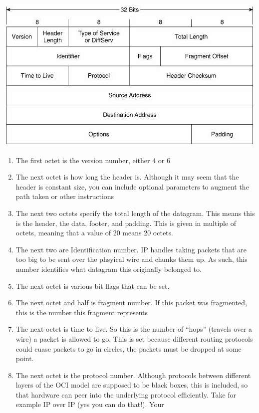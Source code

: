 \documentclass[]{article}
\begin{document}
\includegraphics{networking/images/ipv4_header.png}

\begin{enumerate}
\item
  The first octet is the version number, either 4 or 6
\item
  The next octet is how long the header is. Although it may seem that
  the header is constant size, you can include optional parameters to
  augment the path taken or other instructions
\item
  The next two octets specify the total length of the datagram. This
  means this is the header, the data, footer, and padding. This is given
  in multiple of octets, meaning that a value of 20 means 20 octets.
\item
  The next two are Identification number. IP handles taking packets that
  are too big to be sent over the phsyical wire and chunks them up. As
  such, this number identifies what datagram this originally belonged
  to.
\item
  The next octet is various bit flags that can be set.
\item
  The next octet and half is fragment number. If this packet was
  fragmented, this is the number this fragment represents
\item
  The next octet is time to live. So this is the number of ``hops''
  (travels over a wire) a packet is allowed to go. This is set because
  different routing protocols could cuase packets to go in circles, the
  packets must be dropped at some point.
\item
  The next octet is the protocol number. Although protocols between
  different layers of the OCI model are supposed to be black boxes, this
  is included, so that hardware can peer into the underlying protocol
  efficiently. Take for example IP over IP (yes you can do that!). Your

\end{enumerate}
\end{document}
